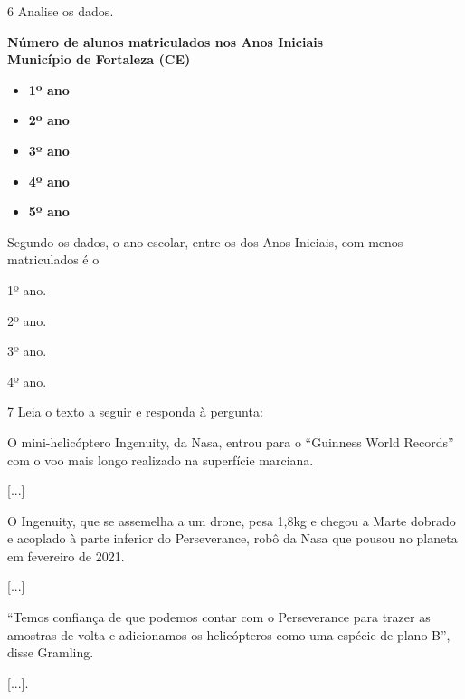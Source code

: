 \num{6} Analise os dados.
\enlargethispage{2\baselineskip}

\begin{myquote}
\textbf{Número de alunos matriculados nos Anos Iniciais}\\
\textbf{Município de Fortaleza (CE)}

\begin{itemize}
\item \textbf{1º ano}

\item \textbf{2º ano}

\item \textbf{3º ano}

\item \textbf{4º ano}

\item \textbf{5º ano}
\end{itemize}
\end{myquote}

Segundo os dados, o ano escolar, entre os dos Anos Iniciais, com menos matriculados é o

\begin{escolha}
\item 1º ano.

\item 2º ano.

\item 3º ano.

\item 4º ano.
\end{escolha}


\num{7} Leia o texto a seguir e responda à pergunta:

\begin{myquote}
O mini-helicóptero Ingenuity, da Nasa, entrou para o “Guinness World
Records” com o voo mais longo realizado na superfície marciana.

{[}...{]}

O Ingenuity, que se assemelha a um drone, pesa 1,8kg e chegou a Marte
dobrado e acoplado à parte inferior do Perseverance, robô da Nasa que
pousou no planeta em fevereiro de 2021.

{[}...{]}

“Temos confiança de que podemos contar com o Perseverance para trazer
as amostras de volta e adicionamos os helicópteros como uma espécie de
plano B”, disse Gramling.

{[}...{]}.
\end{myquote}

